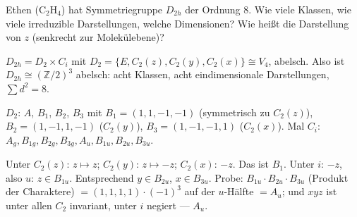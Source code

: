 \begin{aufgabe}
Ethen ($\mathrm{C_2H_4}$) hat Symmetriegruppe $D_{2h}$ der Ordnung $8$. Wie viele Klassen, wie viele irreduzible Darstellungen, welche Dimensionen? Wie heißt die Darstellung von $z$ (senkrecht zur Molekülebene)?

\loesung
{}
$D_{2h} = D_2\times C_i$ mit $D_2 = \{E, C_2(z), C_2(y), C_2(x)\}\cong V_4$, abelsch. Also ist $D_{2h}\cong(\mathbb Z/2)^{3}$ abelsch: acht Klassen, acht eindimensionale Darstellungen, $\sum d^{2} = 8$. \checkmark

$D_2$: $A$, $B_1$, $B_2$, $B_3$ mit $B_1 = (1, 1, -1, -1)$ (symmetrisch zu $C_2(z)$), $B_2 = (1, -1, 1, -1)$ ($C_2(y)$), $B_3 = (1, -1, -1, 1)$ ($C_2(x)$). Mal $C_i$: $A_g, B_{1g}, B_{2g}, B_{3g}, A_u, B_{1u}, B_{2u}, B_{3u}$.

Unter $C_2(z)$: $z\mapsto z$; $C_2(y)$: $z\mapsto-z$; $C_2(x)$: $-z$. Das ist $B_1$. Unter $i$: $-z$, also $u$: $z\in B_{1u}$. Entsprechend $y\in B_{2u}$, $x\in B_{3u}$. Probe: $B_{1u}\cdot B_{2u}\cdot B_{3u}$ (Produkt der Charaktere) $= (1, 1, 1, 1)\cdot(-1)^{3}$ auf der $u$-Hälfte $= A_u$; und $xyz$ ist unter allen $C_2$ invariant, unter $i$ negiert --- $A_u$. \checkmark

\begin{center}
\begin{minipage}{0.88\textwidth}
\end{minipage}
\end{center}
\end{aufgabe}

